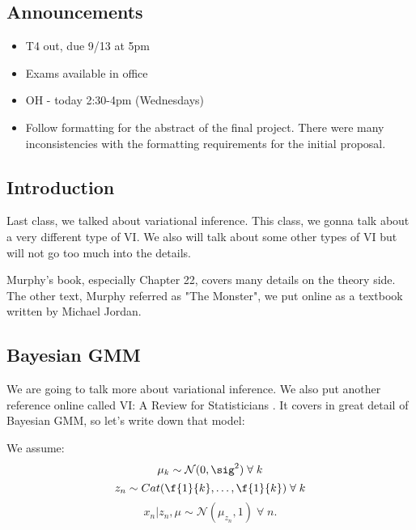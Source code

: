 \documentclass{article}
\begin{document}

\subsection{Announcements} 
\begin{itemize}
\item T4 out, due 9/13 at 5pm
\item Exams available in office
\item OH - today 2:30-4pm (Wednesdays)
\item  Follow formatting for the abstract of the final project. There were many inconsistencies with the formatting requirements for the initial proposal.
\end{itemize} 

\subsection{Introduction}
Last class, we talked about variational inference. This class, we gonna talk about a very different type of VI. We also will talk about some other types of VI but will not go too much into the details.  \newline

Murphy's book, especially Chapter 22, covers many details on the theory side. The other text, Murphy referred as "The Monster", we put online as a textbook written by Michael Jordan.

\subsection{Bayesian GMM}
We are going to talk more about variational inference. We also put another reference online called VI: A Review for Statisticians \cite{BKM17}. It covers in great detail of Bayesian GMM, so let's write down that model:
\begin{center}
\end{center}
We assume:
\[ \mu_k \sim \mathcal{N}(0,\sig^2) \;\forall\;k \]
\[ z_n \sim Cat(\f{1}{k}, \dots,\f{1}{k}) \;\forall\; k\]
\[ x_n | z_n, \mu \sim \mathcal{N}(\mu_{z_n},1) \; \forall \; n. \]
\end{document}
